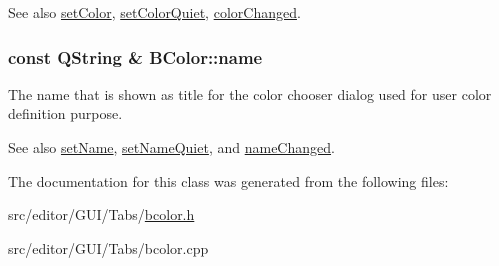 \begin{DoxySeeAlso}{\-See also}
\hyperlink{class_b_color_a901e6704aef22f6db97d3578e14777c6}{set\-Color}, \hyperlink{class_b_color_a3781c2b986f19ceaac7c994767015b56}{set\-Color\-Quiet}, \hyperlink{class_b_color_a75ac94fde91e10eb6c27242f608b8d62}{color\-Changed}. 
\end{DoxySeeAlso}
\hypertarget{class_b_color_a68e6b6c8c92fe004a98b44d48ba8a42a}{
\subsubsection[{name}]{\setlength{\rightskip}{0pt plus 5cm}const \-Q\-String \& {\bf \-B\-Color\-::name}}}\label{class_b_color_a68e6b6c8c92fe004a98b44d48ba8a42a}
\-The name that is shown as title for the color chooser dialog used for user color definition purpose.

\begin{DoxySeeAlso}{\-See also}
\hyperlink{class_b_color_abcf2d57696ada6466424663f15624cad}{set\-Name}, \hyperlink{class_b_color_ac159569b670ed175be068204a28a7be9}{set\-Name\-Quiet}, and \hyperlink{class_b_color_a5895b999f69044b919e6d5526577ad87}{name\-Changed}. 
\end{DoxySeeAlso}


\-The documentation for this class was generated from the following files\-:\begin{DoxyCompactItemize}
\item 
src/editor/\-G\-U\-I/\-Tabs/\hyperlink{bcolor_8h}{bcolor.\-h}\item 
src/editor/\-G\-U\-I/\-Tabs/bcolor.\-cpp\end{DoxyCompactItemize}
